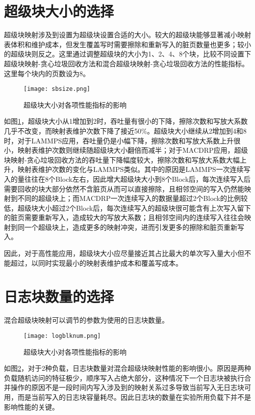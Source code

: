 \section{超级块大小的选择}

超级块映射涉及到设置为超级块设置合适的大小。较大的超级块能够显著减小映射表体积和维护成本，但发生覆盖写时需要擦除和重新写入的脏页数量也更多；较小的超级块则反之。这里通过调整超级块的大小为1、2、4、8个块，比较不同设置下超级块映射-贪心垃圾回收方法和混合超级块映射-贪心垃圾回收方法的性能指标。这里每个块内的页数设为8。

\begin{figure}[H]
    \centering
    \texttt{[image: sbsize.png]}
    \caption{超级块大小对各项性能指标的影响}
    \label{fig:res_sbsize}
\end{figure}

如图\ref{fig:res_sbsize}，超级块大小从1增加到2时，吞吐量有很小的下降，擦除次数和写放大系数几乎不改变，而映射表维护次数下降了接近50\%。超级块大小继续从2增加到4和8时，对于LAMMPS应用，吞吐量仍是小幅下降，擦除次数和写放大系数上升很小，映射表维护次数则继续随超级块大小翻倍而减半；对于MACDRP应用，超级块映射-贪心垃圾回收方法的吞吐量下降幅度较大，擦除次数和写放大系数大幅上升，映射表维护次数的变化与LAMMPS类似。其中的原因是LAMMPS一次连续写入的量往往在8个Block左右，因此增大超级块大小到8个Block后，每次连续写入后需要回收的块大部分依然不含脏页从而可以直接擦除，且相邻空间的写入仍然能映射到不同的超级块上；而MACDRP一次连续写入的数据量超过2个Block的比例较低，超级块大小超过2个Block后，每次连续写入的超级块很可能含有上次写入留下的脏页需要重新写入，造成较大的写放大系数；且相邻空间内的连续写入往往会映射到同一个超级块上，造成更多的映射冲突，进而引发更多的擦除和脏页重新写入。

因此，对于高性能应用，超级块大小应尽量接近其占比最大的单次写入量大小但不能超过，以同时实现最小的映射表维护成本和覆盖写成本。

\section{日志块数量的选择}

混合超级块映射可以调节的参数为使用的日志块数量。

\begin{figure}[H]
    \centering
    \texttt{[image: logblknum.png]}
    \caption{超级块大小对各项性能指标的影响}
    \label{fig:res_logblknum}
\end{figure}

如图\ref{fig:res_logblknum}，对于2种负载，日志块数量对混合超级块映射性能的影响很小。原因是两种负载随机访问的特征极少，顺序写入占绝大部分，这种情况下一个日志块被执行合并操作的原因不是一段时间内写入涉及到的映射关系过多导致当前写入无日志块可用，而是当前写入的日志块容量耗尽。因此日志块的数量在实验所用负载下并不是影响性能的关键。

